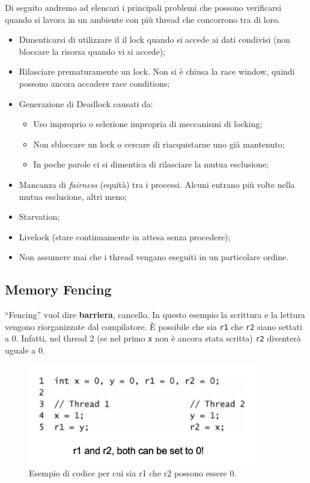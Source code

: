 Di seguito andremo ad elencari i principali problemi che possono verificarsi quando si lavora
in un ambiente con più thread che concorrono tra di loro.

\begin{itemize}
    \item Dimenticarsi di utilizzare il il lock quando si accede ai dati condivisi
          (non bloccare la risorsa quando vi si accede);
    \item Rilasciare prematuramente un lock. Non si è chiusa la race window, quindi
          possono ancora accadere race conditions;
    \item Generazione di Deadlock causati da:
          \begin{itemize}
              \item Uso improprio o selezione impropria di meccanismi di locking;
              \item Non sbloccare un lock o cercare di riacquistarne uno già mantenuto;
              \item In poche parole ci si dimentica di rilasciare la mutua esclusione;
          \end{itemize}
    \item Mancanza di \textit{fairness} (equità) tra i processi.
          Alcuni entrano più volte nella mutua esclusione, altri meno;
    \item Starvation;
    \item Livelock (stare continuamente in attesa senza procedere);
    \item Non assumere mai che i thread vengano eseguiti in un particolare ordine.
\end{itemize}

\subsection{Memory Fencing}

“Fencing” vuol dire \textbf{barriera}, cancello.
In questo esempio la scrittura e la lettura vengono riorganizzate dal compilatore.
È possibile che sia \verb|r1| che \verb|r2| siano settati a 0.
Infatti, nel thread 2 (se nel primo \verb|x| non è ancora stata scritta) \verb|r2|
diventerà uguale a 0.

\begin{figure}[H]
    \centering
    \includegraphics[width=10cm, keepaspectratio]{capitoli/secure_coding/img/cap_6/nofance.png}
    \caption{Esempio di codice per cui sia r1 che r2 possono essere 0.}
\end{figure}

